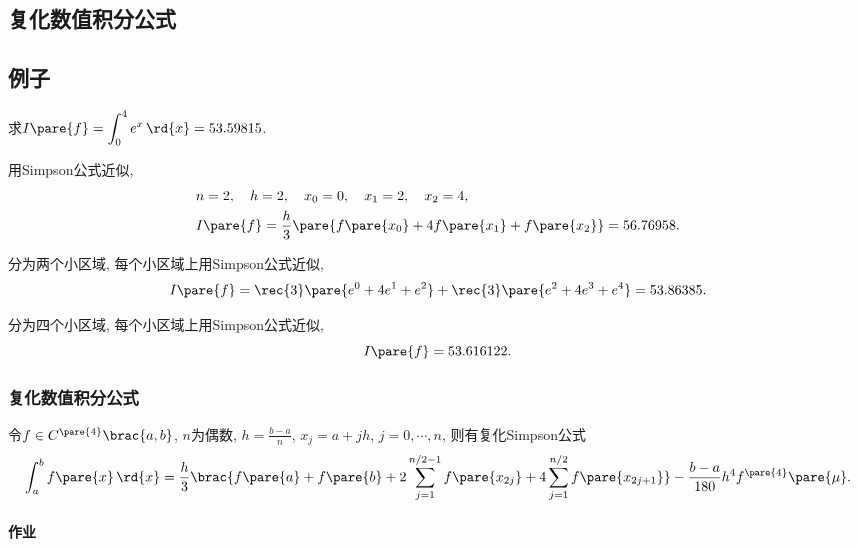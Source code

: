 \documentclass[hidelinks]{ctexart}
\begin{document}


\subsection{复化数值积分公式} %
\label{sub:复化数值积分公式}

\subsection{例子} %
\label{sub:例子}

\begin{ex}
    求$I\pare{f} = \displaystyle \int_0^4 e^x\,\rd{x} = 53.59815$.
    \begin{cenum}
        \item 用Simpson公式近似,
        \begin{align*}
            & n=2,\quad h = 2, \quad x_0 = 0,\quad x_1 = 2, \quad x_2 = 4, \\
            & I\pare{f} = \frac{h}{3}\pare{f\pare{x_0} + 4f\pare{x_1} + f\pare{x_2}} = 56.76958.
        \end{align*}
        \item 分为两个小区域, 每个小区域上用Simpson公式近似,
        \[ I\pare{f} = \rec{3}\pare{e^0 + 4e^1 + e^2} + \rec{3}\pare{e^2 + 4e^3 + e^4} = 53.86385. \]
        \item 分为四个小区域, 每个小区域上用Simpson公式近似,
        \[ I\pare{f} = 53.616122. \]
    \end{cenum}
\end{ex}


\subsubsection{复化数值积分公式} %
\label{ssub:复化数值积分公式}

\begin{theorem}
    令$f\in C^{\pare{4}}\brac{a,b}$, $n$为偶数, $\displaystyle h = \frac{b-a}{n}$, $x_j = a+jh$, $j=0,\cdots,n$, 则有复化Simpson公式
    \[ \int_a^b f\pare{x}\,\rd{x} = \frac{h}{3}\brac{f\pare{a} + f\pare{b} + 2\sum_{j=1}^{n/2-1} f\pare{x_{2j}} + 4\sum_{j=1}^{n/2} f\pare{x_{2j+1}}} - \frac{b-a}{180}h^4 f^{\pare{4}}\pare{\mu}. \]
\end{theorem}

\paragraph{作业} %
\label{par:作业}
\end{document}
